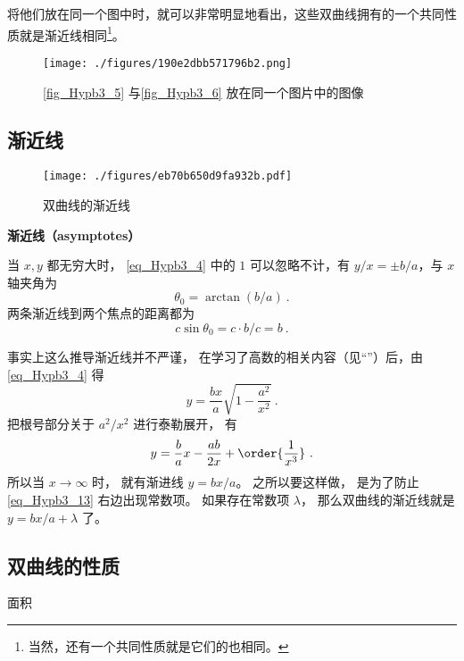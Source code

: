 将他们放在同一个图中时，就可以非常明显地看出，这些双曲线拥有的一个共同性质就是渐近线相同\footnote{当然，还有一个共同性质就是它们的也相同。}。

\begin{figure}[ht]
\centering
\texttt{[image: ./figures/190e2dbb571796b2.png]}
\caption{\autoref{fig_Hypb3_5} 与\autoref{fig_Hypb3_6} 放在同一个图片中的图像} \label{fig_Hypb3_7}
\end{figure}
\subsection{渐近线}
\begin{figure}[ht]
\centering
\texttt{[image: ./figures/eb70b650d9fa932b.pdf]}
\caption{双曲线的渐近线} \label{fig_Hypb3_1}
\end{figure}
\textbf{渐近线（asymptotes）}

当 $x,y$ 都无穷大时， \autoref{eq_Hypb3_4} 中的 $1$ 可以忽略不计，有 $y/x = \pm b/a$，与 $x$ 轴夹角为
\begin{equation}\label{eq_Hypb3_1}
\theta_0 = \arctan(b/a)~.
\end{equation}
两条渐近线到两个焦点的距离都为
\begin{equation}\label{eq_Hypb3_11}
c\sin\theta_0 = c\cdot b/c = b~.
\end{equation}

事实上这么推导渐近线并不严谨， 在学习了高数的相关内容（见“”）后，由\autoref{eq_Hypb3_4} 得
\begin{equation}
y = \frac{bx}{a} \sqrt{1-\frac{a^2}{x^2}}~.
\end{equation}
把根号部分关于 $a^2/x^2$ 进行泰勒展开， 有
\begin{equation}\label{eq_Hypb3_13}
y = \frac ba x - \frac{ab}{2x} + \order{\frac{1}{x^3}}~.
\end{equation}
所以当 $x\to\infty$ 时， 就有渐进线 $y = bx/a$。 之所以要这样做， 是为了防止\autoref{eq_Hypb3_13} 右边出现常数项。 如果存在常数项 $\lambda$， 那么双曲线的渐近线就是 $y = bx/a + \lambda$ 了。

\subsection{双曲线的性质}
面积









